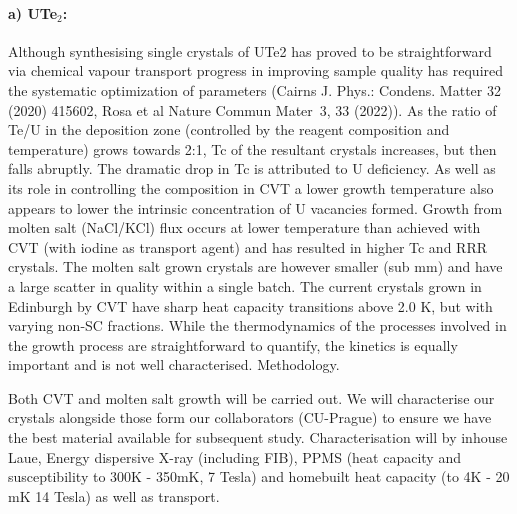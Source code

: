   \paragraph {a) UTe$_2$:} 
  

Although synthesising single crystals of UTe2 has proved to be straightforward via chemical vapour transport progress in improving sample quality has required the systematic optimization of parameters (Cairns J. Phys.: Condens. Matter 32 (2020) 415602, Rosa et al Nature Commun Mater 3, 33 (2022)). As the ratio of Te/U in the deposition zone (controlled by the reagent composition and temperature) grows towards 2:1, Tc of the resultant crystals increases, but then falls abruptly. The dramatic drop in Tc is attributed to U deficiency. As well as its role in controlling the composition in CVT a lower growth temperature also appears to lower the intrinsic concentration of U vacancies formed. Growth from molten salt (NaCl/KCl) flux occurs at lower temperature than achieved with CVT (with iodine as transport agent) and has resulted in higher Tc and RRR crystals. The molten salt grown crystals are however smaller (sub mm) and have a large scatter in quality within a single batch. The current crystals grown in Edinburgh by CVT have sharp heat capacity transitions above 2.0 K, but with varying non-SC fractions. While the thermodynamics of the processes involved in the growth process are straightforward to quantify, the kinetics is equally important and is not well characterised.
Methodology.

Both CVT and molten salt growth will be carried out. We will characterise our crystals alongside those form our collaborators (CU-Prague) to ensure we have the best material available for subsequent study. Characterisation will  by inhouse Laue, Energy dispersive X-ray (including FIB), PPMS (heat capacity and susceptibility to 300K - 350mK, 7 Tesla) and homebuilt heat capacity (to 4K - 20 mK 14 Tesla) as well as transport.

